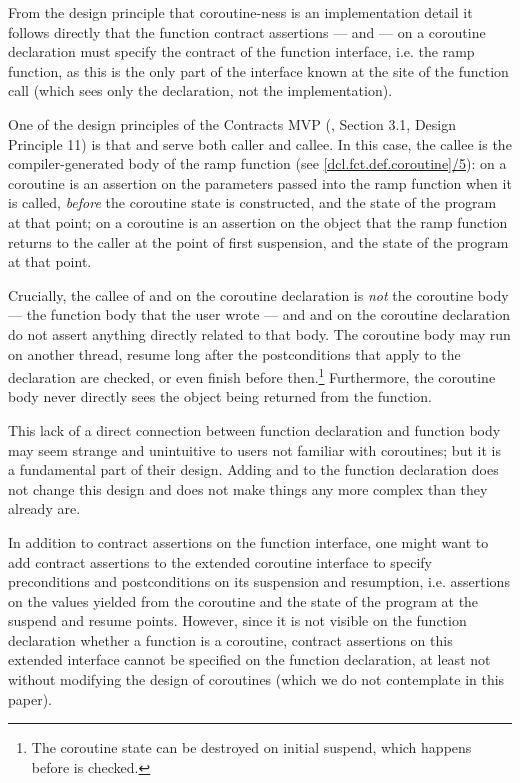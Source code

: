 From the design principle that coroutine-ness is an implementation detail it follows directly that the function contract assertions ---  and  --- on a coroutine declaration must specify the contract of the function interface, i.e. the ramp function, as this is the only part of the interface known at the site of the function call (which sees only the declaration, not the implementation).

One of the design principles of the Contracts MVP (\cite{P2900R8}, Section 3.1, Design Principle 11) is that  and  serve both caller and callee. In this case, the callee is the compiler-generated body of the ramp function (see \href{https://eel.is/c++draft/dcl.fct.def.coroutine#5}{[dcl.fct.def.coroutine]/5}):  on a coroutine is an assertion on the parameters passed into the ramp function when it is called, \emph{before} the coroutine state is constructed, and the state of the program at that point;  on a coroutine is an assertion on the object that the ramp function returns to the caller at the point of first suspension, and the state of the program at that point.

Crucially, the callee of  and  on the coroutine declaration is \emph{not} the coroutine body --- the function body that the user wrote --- and  and  on the coroutine declaration do not assert anything directly related to that body. The coroutine body may run on another thread, resume long after the postconditions that apply to the declaration are checked, or even finish before then.\footnote{The coroutine state can be destroyed on initial suspend, which happens before  is checked.} Furthermore, the coroutine body never directly sees the object being returned from the function.

This lack of a direct connection between function declaration and function body may seem strange and unintuitive to users not familiar with coroutines; but it is a fundamental part of their design. Adding  and  to the function declaration does not change this design and does not make things any more complex than they already are.

In addition to contract assertions on the function interface, one might want to add contract assertions to the extended coroutine interface to specify preconditions and postconditions on its suspension and resumption, i.e. assertions on the values yielded from the coroutine and the state of the program at the suspend and resume points. However, since it is not visible on the function declaration whether a function is a coroutine, contract assertions on this extended interface cannot be specified on the function declaration, at least not without modifying the design of coroutines (which we do not contemplate in this paper).


